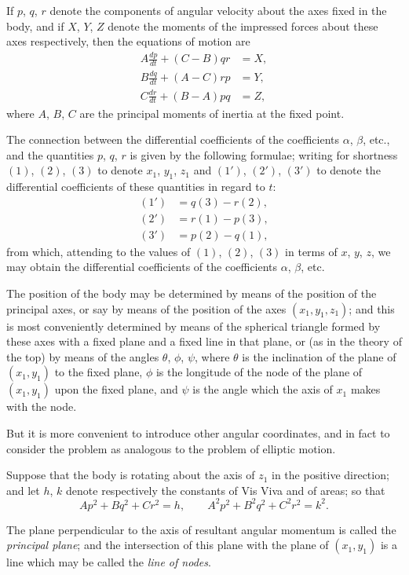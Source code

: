 \documentclass[11pt,a4paper]{article}
\begin{document}
If $p$, $q$, $r$ denote the components of angular velocity about the axes fixed in the body, and if $X$, $Y$, $Z$ denote the moments of the impressed forces about these axes respectively, then the equations of motion are
\begin{align*}
A\frac{dp}{dt} + (C-B)qr &= X, \\
B\frac{dq}{dt} + (A-C)rp &= Y, \\
C\frac{dr}{dt} + (B-A)pq &= Z,
\end{align*}
where $A$, $B$, $C$ are the principal moments of inertia at the fixed point.

The connection between the differential coefficients of the coefficients $\alpha$, $\beta$, etc., and the quantities $p$, $q$, $r$ is given by the following formulae; writing for shortness $(1)$, $(2)$, $(3)$ to denote $x_1$, $y_1$, $z_1$ and $(1')$, $(2')$, $(3')$ to denote the differential coefficients of these quantities in regard to $t$:
\begin{align*}
(1') &= q(3) - r(2), \\
(2') &= r(1) - p(3), \\
(3') &= p(2) - q(1),
\end{align*}
from which, attending to the values of $(1)$, $(2)$, $(3)$ in terms of $x$, $y$, $z$, we may obtain the differential coefficients of the coefficients $\alpha$, $\beta$, etc.

The position of the body may be determined by means of the position of the principal axes, or say by means of the position of the axes $(x_1, y_1, z_1)$; and this is most conveniently determined by means of the spherical triangle formed by these axes with a fixed plane and a fixed line in that plane, or (as in the theory of the top) by means of the angles $\theta$, $\phi$, $\psi$, where $\theta$ is the inclination of the plane of $(x_1, y_1)$ to the fixed plane, $\phi$ is the longitude of the node of the plane of $(x_1, y_1)$ upon the fixed plane, and $\psi$ is the angle which the axis of $x_1$ makes with the node.

But it is more convenient to introduce other angular coordinates, and in fact to consider the problem as analogous to the problem of elliptic motion.

Suppose that the body is rotating about the axis of $z_1$ in the positive direction; and let $h$, $k$ denote respectively the constants of Vis Viva and of areas; so that
\[
Ap^2 + Bq^2 + Cr^2 = h, \qquad A^2p^2 + B^2q^2 + C^2r^2 = k^2.
\]

The plane perpendicular to the axis of resultant angular momentum is called the \textit{principal plane}; and the intersection of this plane with the plane of $(x_1, y_1)$ is a line which may be called the \textit{line of nodes}.
\end{document}
